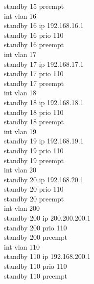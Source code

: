 \documentclass[a4paper, 12pt]{article}
\begin{document}
{\hspace*{2cm}standby 15 preempt\\
\hspace*{2cm}int vlan 16\\
\hspace*{2cm}standby 16 ip 192.168.16.1\\
\hspace*{2cm}standby 16 prio 110\\
\hspace*{2cm}standby 16 preempt\\
\hspace*{2cm}int vlan 17\\
\hspace*{2cm}standby 17 ip 192.168.17.1\\
\hspace*{2cm}standby 17 prio 110\\
\hspace*{2cm}standby 17 preempt\\
\hspace*{2cm}int vlan 18\\
\hspace*{2cm}standby 18 ip 192.168.18.1\\
\hspace*{2cm}standby 18 prio 110\\
\hspace*{2cm}standby 18 preempt\\
\hspace*{2cm}int vlan 19\\
\hspace*{2cm}standby 19 ip 192.168.19.1\\
\hspace*{2cm}standby 19 prio 110\\
\hspace*{2cm}standby 19 preempt\\
\hspace*{2cm}int vlan 20\\
\hspace*{2cm}standby 20 ip 192.168.20.1\\
\hspace*{2cm}standby 20 prio 110\\
\hspace*{2cm}standby 20 preempt\\
\hspace*{2cm}int vlan 200\\
\hspace*{2cm}standby 200 ip 200.200.200.1\\
\hspace*{2cm}standby 200 prio 110\\
\hspace*{2cm}standby 200 preempt\\
\hspace*{2cm}int vlan 110\\
\hspace*{2cm}standby 110 ip 192.168.200.1\\
\hspace*{2cm}standby 110 prio 110\\
\hspace*{2cm}standby 110 preempt\\}
\end{document}
